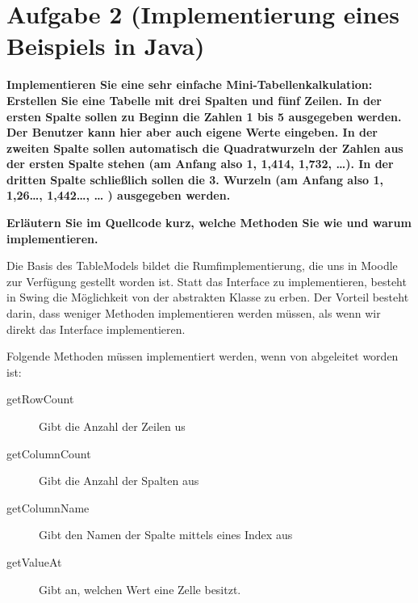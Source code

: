 \section{Aufgabe 2 (Implementierung eines Beispiels in Java)}
\textbf{Implementieren Sie eine sehr einfache Mini-Tabellenkalkulation:
Erstellen Sie eine Tabelle mit drei Spalten und fünf Zeilen. In der ersten Spalte sollen zu
Beginn die Zahlen 1 bis 5 ausgegeben werden. Der Benutzer kann hier aber auch eigene
Werte eingeben. In der zweiten Spalte sollen automatisch die Quadratwurzeln der Zahlen
aus der ersten Spalte stehen (am Anfang also 1, 1,414, 1,732, …). In der dritten Spalte
schließlich sollen die 3. Wurzeln (am Anfang also 1, 1,26…, 1,442…, … ) ausgegeben
werden.}

\textbf{Erläutern Sie im Quellcode kurz, welche Methoden Sie wie und warum
implementieren.}

Die Basis des TableModels bildet die Rumfimplementierung, die uns in Moodle zur
Verfügung gestellt worden ist. Statt das Interface  zu
implementieren, besteht in Swing die Möglichkeit von der abstrakten Klasse 
 zu erben. Der Vorteil besteht darin, dass weniger
Methoden implementieren werden müssen, als wenn wir direkt das Interface
implementieren.

Folgende Methoden müssen implementiert werden, wenn von
 abgeleitet worden ist:

\begin{description}
\item[getRowCount] Gibt die Anzahl der Zeilen us
\item[getColumnCount] Gibt die Anzahl der Spalten aus
\item[getColumnName] Gibt den Namen der Spalte mittels eines Index aus
\item[getValueAt] Gibt an, welchen Wert eine Zelle besitzt.
\end{description}

